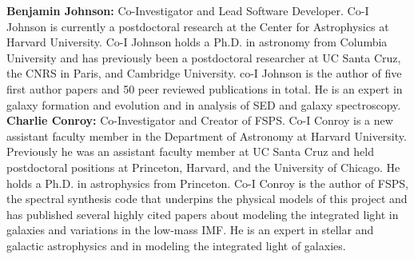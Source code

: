 \documentclass[11pt,preprint]{aastex}
\begin{document}
\textbf{Benjamin Johnson:} Co-Investigator and Lead Software Developer.  Co-I Johnson is currently a postdoctoral research at the Center for Astrophysics at Harvard University.  Co-I Johnson holds a Ph.D. in astronomy from Columbia University and has previously been a postdoctoral researcher at UC Santa Cruz, the CNRS in Paris, and Cambridge University.  co-I Johnson is the author of five first author papers and 50 peer reviewed publications in total.  He is an expert in galaxy formation and evolution and in analysis of SED and galaxy spectroscopy.  \\

\textbf{Charlie Conroy:}  Co-Investigator and Creator of FSPS.  Co-I Conroy is a new assistant faculty member in the Department of Astronomy at Harvard University.  Previously he was an assistant faculty member at UC Santa Cruz and held postdoctoral positions at Princeton, Harvard, and the University of Chicago.  He holds a Ph.D. in astrophysics from Princeton.  Co-I Conroy is the author of FSPS, the spectral synthesis code that underpins the physical models of this project and has published several highly cited papers about modeling the integrated light in galaxies and variations in the low-mass IMF.  He is an expert in stellar and galactic astrophysics and in modeling the integrated light of galaxies. \\





\end{document}
